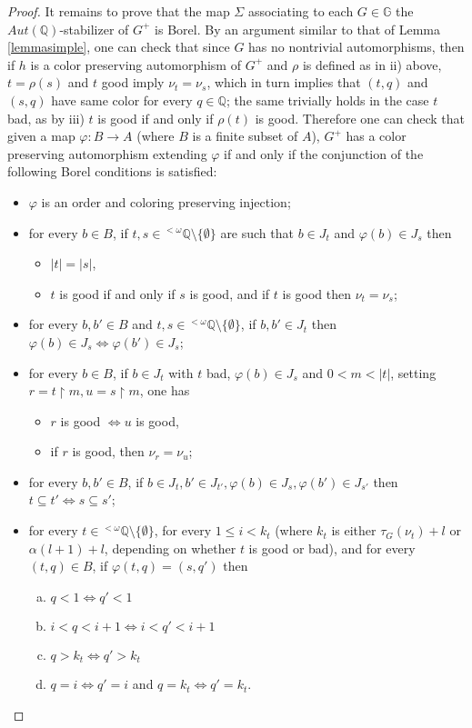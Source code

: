 \documentclass{amsart}
\theoremstyle{definition}
\theoremstyle{remark}
\begin{document}
\begin{proof}
It remains to prove that the map $\Sigma$ associating to each $G \in {\mathbb{G}}$ the
$Aut({\mathbb{Q}})$-stabilizer of $G^+$ is Borel. By an argument similar to
that of Lemma \ref{lemmasimple}, one can check that since $G$ has no
nontrivial automorphisms, then if $h$ is a color preserving
automorphism of $G^+$  and
$\rho$ is defined as in ii) above, $t = \rho(s)$ and $t$ good imply
$\nu_t = \nu_s$, which in turn implies that $(t,q)$ and $(s,q)$ have
same color for every $q \in {\mathbb{Q}}$; the same trivially holds in the
case $t$ bad, as by iii) $t$ is good if and only if $\rho(t)$ is
good. Therefore one can check that given a map
${\varphi} \colon B \to A$ (where $B$ is a finite subset of $A$), $G^+$
has a color preserving automorphism extending ${\varphi}$ if and only if the conjunction of
the following Borel conditions is satisfied:
\begin{itemize}
\item ${\varphi}$ is an order and coloring preserving injection;
\item for every $b \in B$, if $t,s \in {}^{< \omega} {\mathbb{Q}} \setminus \{
  \emptyset \}$ are such that $b \in J_t$ and ${\varphi}(b) \in J_s$ then
\begin{itemize}
\item $|t|=|s|$,
\item $t$ is good if and only if $s$ is good, and if $t$ is good then
  $\nu_t = \nu_s$;
\end{itemize}
\item for every $b,b' \in B$ and $t,s \in {}^{< \omega} {\mathbb{Q}} \setminus
  \{ \emptyset \}$, if $b,b' \in J_t$ then ${\varphi}(b) \in J_s \iff
  {\varphi}(b') \in J_s$;
\item for every $b\in B$, if $b\in J_t$ with $t$ bad, $ {\varphi} (b)\in J_s$ and $0<m<|t|$, setting $r=t\restriction m,u=s\restriction m$, one has
\begin{itemize}
\item $r$ is good $ \iff u$ is good,
\item if $r$ is good, then $\nu_r=\nu_u$;
\end{itemize}
\item for every $b,b'\in B$, if $b\in J_t,b'\in J_{t'}, {\varphi} (b)\in J_s, {\varphi} (b')\in J_{s'}$ then $t\subseteq t' \iff s\subseteq s'$;
\item for every $t \in {}^{< \omega} {\mathbb{Q}} \setminus \{ \emptyset \}$,
  for every $1 \leq i < k_t$ (where $k_t$ is either $\tau_G(\nu_t)
  + l$ or $\alpha(l+1)+l$, depending on whether $t$ is good or bad),
  and for every $(t,q) \in B$, if ${\varphi}(t,q) = (s,q')$ then
\begin{enumerate}[a)]
\item $q < 1 \iff q' < 1$
\item $i < q < i+1 \iff i < q' < i+1$
\item $q > k_t \iff q' > k_t$
\item $q = i \iff q' = i$ and $q = k_t \iff q' = k_t$. \qedhere
\end{enumerate}
\end{itemize}
\end{proof}
\end{document}
